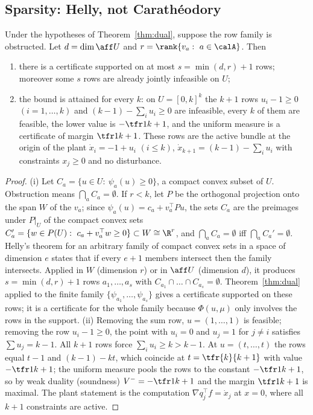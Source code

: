 \subsection{Sparsity: Helly, not Carath\'eodory}

\begin{theorem}\label{thm:helly}
Under the hypotheses of Theorem~\ref{thm:dual}, suppose the row family is obstructed. Let $d=\dim\aff U$ and $r=\rank\{v_a:\ a\in\calA\}$. Then
\begin{enumerate}[leftmargin=1.6em,itemsep=1pt]
\item[(i)] there is a certificate supported on at most $s=\min(d,r)+1$ rows; moreover some $s$ rows are already jointly infeasible on $U$;
\item[(ii)] the bound is attained for every $k$: on $U=[0,k]^k$ the $k+1$ rows $u_i-1\ge0$ $(i=1,\dots,k)$ and $(k-1)-\sum_iu_i\ge0$ are infeasible, every $k$ of them are feasible, the lower value is $-\tfr1{k+1}$, and the uniform measure is a certificate of margin $\tfr1{k+1}$. These rows are the active bundle at the origin of the plant $\dot x_i=-1+u_i$ $(i\le k)$, $\dot x_{k+1}=(k-1)-\sum_iu_i$ with constraints $x_j\ge0$ and no disturbance.
\end{enumerate}
\end{theorem}

\begin{proof}
(i) Let $C_a=\{u\in U:\ \psi_a(u)\ge0\}$, a compact convex subset of $U$. Obstruction means $\bigcap_aC_a=\emptyset$. If $r<k$, let $P$ be the orthogonal projection onto the span $W$ of the $v_a$; since $\psi_a(u)=c_a+v_a^\top Pu$, the sets $C_a$ are the preimages under $P|_U$ of the compact convex sets $C_a'=\{w\in P(U):\ c_a+v_a^\top w\ge0\}\subset W\cong\R^r$, and $\bigcap_aC_a=\emptyset$ iff $\bigcap_aC_a'=\emptyset$. Helly's theorem for an arbitrary family of compact convex sets in a space of dimension $e$ \cite{Helly1923,Rockafellar1970} states that if every $e+1$ members intersect then the family intersects. Applied in $W$ (dimension $r$) or in $\aff U$ (dimension $d$), it produces $s=\min(d,r)+1$ rows $a_1,\dots,a_s$ with $C_{a_1}\cap\dots\cap C_{a_s}=\emptyset$. Theorem~\ref{thm:dual} applied to the finite family $\{\psi_{a_1},\dots,\psi_{a_s}\}$ gives a certificate supported on these rows; it is a certificate for the whole family because $\Phi(u,\mu)$ only involves the rows in the support. (ii) Removing the sum row, $u=(1,\dots,1)$ is feasible; removing the row $u_i-1\ge0$, the point with $u_i=0$ and $u_j=1$ for $j\ne i$ satisfies $\sum u_j=k-1$. All $k+1$ rows force $\sum_iu_i\ge k>k-1$. At $u=(t,\dots,t)$ the rows equal $t-1$ and $(k-1)-kt$, which coincide at $t=\tfr{k}{k+1}$ with value $-\tfr1{k+1}$; the uniform measure pools the rows to the constant $-\tfr1{k+1}$, so by weak duality (soundness) $V^-=-\tfr1{k+1}$ and the margin $\tfr1{k+1}$ is maximal. The plant statement is the computation $\nabla q_j^\top f=\dot x_j$ at $x=0$, where all $k+1$ constraints are active.
\end{proof}

